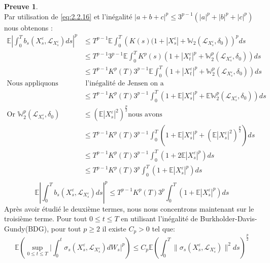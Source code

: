 \documentclass[12pt,a4paper,twoside,fleqn]{book}%
\theoremstyle{definition}
\newtheorem*{pr}{\textbf{Preuve}}
\theoremstyle{lemme}
\numberwithin{equation}{section}
\begin{document}
\begin{pr}
\[\]
Par utilisation de \ref{eq:2.2.16} et l'inégalité $|a+b+c|^p\leq 3^{p-1}(|a|^p + |b|^p + |c|^p)$ nous obtenons :
\[
	\begin{aligned}
	\mathbb{E}\left|\int_{0}^{T}b_s(X_s^\varepsilon,\mathcal{L}_{X_s^\varepsilon})ds\right|^p &\leq T^{p-1}\mathbb{E}\int_{0}^{T}\left(K(s)(1 + |X_s^\varepsilon| +\mathbb{W}_2(\mathcal{L}_{X_s^\varepsilon},\delta_0)\right)^pds \\
	&\leq T^{p-1}3^{p-1}\mathbb{E}\int_{0}^{T}K^p(s)\left(1 +|X_t^\varepsilon|^p + \mathbb{W}_2^p(\mathcal{L}_{X_s^\varepsilon},\delta_0)\right)ds\\
	& \leq T^{p-1}K^p(T)3^{p-1}\mathbb{E}\int_{0}^{T}\left(1 +|X_t^\varepsilon|^p + \mathbb{W}_2^p(\mathcal{L}_{X_s^\varepsilon},\delta_0)\right)ds \\
	\text{Nous appliquons}&\text{ l'inégalité de Jensen on a} \\
	& \leq T^{p-1}K^p(T)3^{p-1} \int_{0}^{T}\left(1 + \mathbb{E}|X_s^\varepsilon|^p + \mathbb{E}\mathbb{W}_2^p(\mathcal{L}_{X_s^\varepsilon},\delta_0)\right)ds \\
	\text{Or }  \mathbb{W}_2^p(\mathcal{L}_{X_s^\varepsilon},\delta_0)&\leq(\mathbb{E}|X_s^\varepsilon|^2)^{\frac{p}{2}} \text{nous avons}\\
	&\leq T^{p-1}K^p(T)3^{p-1} \int_{0}^{T}\left(1 + \mathbb{E}|X_s^\varepsilon|^p + (\mathbb{E}|X_s^\varepsilon|^2)^\frac{p}{2}\right)ds \\ 
	&\leq T^{p-1}K^p(T)3^{p-1} \int_{0}^{T}\left(1 + 2\mathbb{E}|X_s^\varepsilon|^p\right)ds \\
	& \leq T^{p-1}K^p(T)3^{p} \int_{0}^{T}\left(1 + \mathbb{E}|X_s^\varepsilon|^p\right)ds\\
	\end{aligned}
	\]
	\begin{equation}\label{eq:2.2.18}
	\mathbb{E}\left|\int_{0}^{T}b_s(X_s^\varepsilon,\mathcal{L}_{X_s^\varepsilon})ds\right|^p \leq T^{p-1}K^p(T)3^{p}\int_{0}^{T}\left(1 + \mathbb{E}|X_s^\varepsilon|^p\right)ds
	\end{equation}
Après avoir étudié le deuxième termes, nous nous concentrons maintenant sur le troisième terme. Pour tout $ 0\leq t\leq T$ en utilisant l'inégalité de Burkholder-Davis-Gundy(BDG), pour tout $p\geq2$ il existe $C_p> 0$ tel que:
\[
\mathbb{E}\left(\sup_{0\leq t \leq T}\Big|\int_{0}^{t}\sigma_s(X_s^\varepsilon,\mathcal{L}_{X_s^\varepsilon})dW_s\Big|^p\right)\leq C_p \mathbb{E}\left(\int_{0}^{T}\|\sigma_s(X_s^\varepsilon,\mathcal{L}_{X_s^\varepsilon})\|^2ds\right)^{\frac{p}{2}}
\]
\end{pr}
\end{document}
